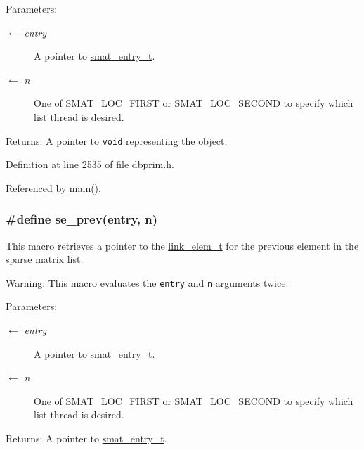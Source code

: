 \begin{Desc}
\item[Parameters:]
\begin{description}
\item[\mbox{$\leftarrow$} {\em entry}]A pointer to \hyperlink{group__dbprim__smat_ga2}{smat\_\-entry\_\-t}. \item[\mbox{$\leftarrow$} {\em n}]One of \hyperlink{group__dbprim__smat_gga70a137}{SMAT\_\-LOC\_\-FIRST} or \hyperlink{group__dbprim__smat_gga70a138}{SMAT\_\-LOC\_\-SECOND} to specify which list thread is desired.\end{description}
\end{Desc}
\begin{Desc}
\item[Returns:]A pointer to {\tt void} representing the object.\end{Desc}


Definition at line 2535 of file dbprim.h.

Referenced by main().\hypertarget{group__dbprim__smat_ga63}{
\subsubsection[se\_\-prev]{\setlength{\rightskip}{0pt plus 5cm}\#define se\_\-prev(entry, n)}}
\label{group__dbprim__smat_ga63}


This macro retrieves a pointer to the \hyperlink{group__dbprim__link_ga1}{link\_\-elem\_\-t} for the previous element in the sparse matrix list.

\begin{Desc}
\item[Warning:]This macro evaluates the {\tt entry} and {\tt n} arguments twice.\end{Desc}
\begin{Desc}
\item[Parameters:]
\begin{description}
\item[\mbox{$\leftarrow$} {\em entry}]A pointer to \hyperlink{group__dbprim__smat_ga2}{smat\_\-entry\_\-t}. \item[\mbox{$\leftarrow$} {\em n}]One of \hyperlink{group__dbprim__smat_gga70a137}{SMAT\_\-LOC\_\-FIRST} or \hyperlink{group__dbprim__smat_gga70a138}{SMAT\_\-LOC\_\-SECOND} to specify which list thread is desired.\end{description}
\end{Desc}
\begin{Desc}
\item[Returns:]A pointer to \hyperlink{group__dbprim__smat_ga2}{smat\_\-entry\_\-t}.\end{Desc}


